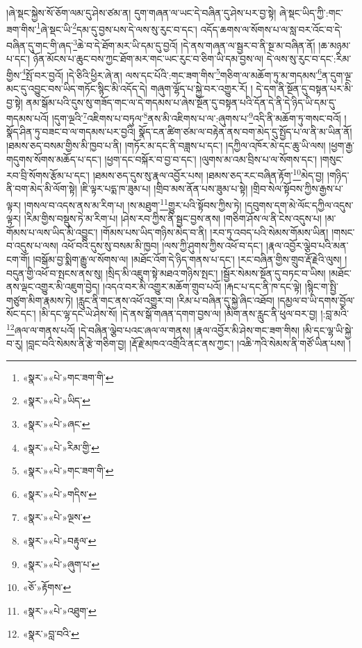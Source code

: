 །ཞེ་སྡང་སྐྱེས་སོ་ཅོག་ལམ་དུ་ཤེས་ཙམ་ན། དུག་གཞན་ལ་ཡང་དེ་བཞིན་དུ་ཤེས་པར་བྱ་སྟེ། ཞེ་སྡང་ཡིད་ཀྱི་:གང་ཟག་གིས་\footnote{«སྣར་»«པེ་»གང་ཟག་གི་}ཞེ་སྡང་ཡི་\footnote{«སྣར་»«པེ་»ཡིད་}དམ་དུ་བྱས་པས་དེ་ལས་སུ་རུང་བ་དང་། འདོད་ཆགས་ལ་སོགས་པ་ལ་སླ་བར་འོང་བ་དེ་བཞིན་དུ་གང་གི་ཞད་\footnote{«སྣར་»«པེ་»ཞང་}ཆེ་བ་དེ་ཐོག་མར་ཡི་དམ་དུ་བྱའོ། །དེ་ནས་གཞན་ལ་སྦྱར་བ་ནི་སྔ་མ་བཞིན་ནོ། །ཆ་མཉམ་པ་དང་། ཉོན་མོངས་པ་ཆུང་བས་ཀྱང་ཐོག་མར་གང་ཡང་རུང་བ་ཅིག་ཡི་དམ་བྱས་ལ། དེ་ལས་སུ་རུང་བ་དང་:རིམ་གྱིས་\footnote{«སྣར་»«པེ་»རིམ་གྱི་}སྤོ་བར་བྱའོ། །དེ་ཅིའི་ཕྱིར་ཞེ་ན། ལས་དང་པོའི་:གང་ཟག་གིས་\footnote{«སྣར་»«པེ་»གང་ཟག་གི་}གཅིག་ལ་མཆོག་ཏུ་མ་གདམས་\footnote{«སྣར་»«པེ་»གདིས་}ན་དུག་ལྔ་མང་དུ་འབྱུང་བས་ཡིད་གཏོང་སྙིང་མི་འདོད་དེ། གཞུག་ལྷོད་པ་སྐྱེ་བར་འགྱུར་རོ། །
དེ་དག་ནི་སྔོན་དུ་བསྟན་པར་མི་བྱ་སྟེ། ནམ་སྒོམ་པའི་དུས་སུ་གཟོད་གང་ལ་དེ་གདམས་པ་ཞེས་སྔོན་དུ་བསྟན་པའི་དོན་དེ་ནི་དེ་ཉིད་ཡི་དམ་དུ་གདམས་པའོ། །དུག་ལྔའི་\footnote{«སྣར་»«པེ་»ལྔས་}འཇིགས་པ་བཏུལ་\footnote{«སྣར་»«པེ་»བརྟུལ་}ནས་མི་འཇིགས་པ་ལ་:ཞུགས་པ་\footnote{«སྣར་»«པེ་»ཞུག་པ་}འདི་ནི་མཆོག་ཏུ་གསང་བའོ། །སྣོད་ཤིན་ཏུ་བཟང་བ་ལ་གདམས་པར་བྱའི། སྣོད་ངན་ཚིག་ཙམ་ལ་བརྟེན་ནས་བག་མེད་དུ་སྤྱོད་པ་ལ་ནི་མ་ཡིན་ནོ། །ཐམས་ཅད་བསམ་གྱིས་མི་ཁྱབ་པ་ནི། །གཏོར་མ་དང་ནི་བཟླས་པ་དང་། །དཀྱིལ་འཁོར་མེ་དང་ཆུ་ཡི་ལས། །ཕྱག་རྒྱ་གདུགས་སོགས་མཆོད་པ་དང་། །ཕྱག་དང་བསྐོར་བ་བྱ་བ་དང་། །ལུགས་མ་འམ་བྲིས་པ་ལ་སོགས་དང་། །གསུང་རབ་བྲི་སོགས་རྩོམ་པ་དང་། །ཐམས་ཅད་དུས་སུ་རྣལ་འབྱོར་པས། །ཐམས་ཅད་རང་བཞིན་རྟོག་\footnote{«ཅོ་»རྟོགས་}མེད་བྱ། །གཉིད་ནི་བག་མེད་མི་ལོག་སྟེ། །ཇི་ལྟར་པདྨ་ཁ་ཟུམ་པ། །གྲིབ་མས་ནོན་པས་ཟུམ་པ་སྟེ། །གྲིབ་སེལ་སྟོབས་ཀྱིས་རྒྱས་པ་ལྟར། །གསལ་བ་འདས་ནས་མ་རིག་པ། །ས་མཐུག་\footnote{«སྣར་»«པེ་»འཐུག་}གྱུར་པའི་སྟོབས་ཀྱིས་ཏེ། །དབུགས་དག་མེ་ལོང་དཀྱིལ་འདུས་ལྟར། །རིམ་གྱིས་བསྡུས་ཏེ་མ་རིག་པ། །ཤེས་རབ་ཀྱིས་ནི་སྦྱང་བྱས་ནས། །གཅིག་ཤོས་ལ་ནི་ངེས་འདུས་པ། །མ་གོམས་པ་ལས་ཡིད་མི་འབྱུང་། །གོམས་པས་ཡིད་གཉིས་མེད་བ་ནི། །རབ་ཏུ་འབད་པའི་སེམས་གོམས་ཡིན། །གསང་བ་འདུས་པ་ལས། འཕོ་བའི་དུས་སུ་བསམ་མི་ཁྱབ། །ལས་ཀྱི་ཤུགས་ཀྱིས་འཕོ་བ་དང་། །རྣལ་འབྱོར་ལྕེབ་པའི་མན་ངག་གོ། །བསྒོམ་བྱ་སྨིག་རྒྱུ་ལ་སོགས་ལ། །མཐོང་འོག་དེ་ཉིད་གནས་པ་དང་། །རང་བཞིན་གྱིས་གྲུབ་རྡོ་རྗེའི་ལུས། །བདུན་གྱི་འཕོ་བ་སྤངས་ནས་སུ། །སྲིད་མི་འཇུག་སྟེ་མཐའ་གཉིས་སྤང་། །སྦྱོར་སེམས་སྔོན་དུ་བཏང་བ་ཡིས། །མཐོང་ནས་ལྡང་འགྱུར་མི་འཇུག་བྱེད། །འདའ་བར་མི་འགྱུར་མཆོག་གྲུབ་པའོ། །རྐང་པ་དང་ནི་ཁ་དང་ལྟེ། །སྙིང་ག་སྤྱི་གཙུག་མིག་རྣམས་ཏེ། །རླུང་ནི་གང་ནས་འཕོ་འགྱུར་བ། །རིམ་པ་བཞིན་དུ་སྐྱེ་ཞིང་འཐོབ། །དམྱལ་བ་ཡི་དགས་བྱོལ་སོང་དང་། །མི་དང་ལྷ་དང་ཡེ་ཤེས་སོ། །དེ་ནས་སྒོ་གཞན་དགག་བྱས་ལ། །མིག་ནས་རླུང་ནི་ཕུལ་བར་བྱ། །:བླ་མའི་\footnote{«སྣར་»བླ་བའི་}ཞལ་ལ་གནས་པའོ། །དེ་བཞིན་ལྕེབ་པའང་ཞལ་ལ་གནས། །རྣལ་འབྱོར་མི་ཤེས་གང་ཟག་གིས། །མི་དང་ལྷ་ཡི་སྐྱེ་བ་རུ། །བླང་བའི་སེམས་ནི་རྩེ་གཅིག་བྱ། །རྡོ་རྗེ་མཁའ་འགྲོའི་ནང་ནས་ཀྱང་། །འཆི་ཀའི་སེམས་ནི་གཙོ་ཡིན་པས། །
